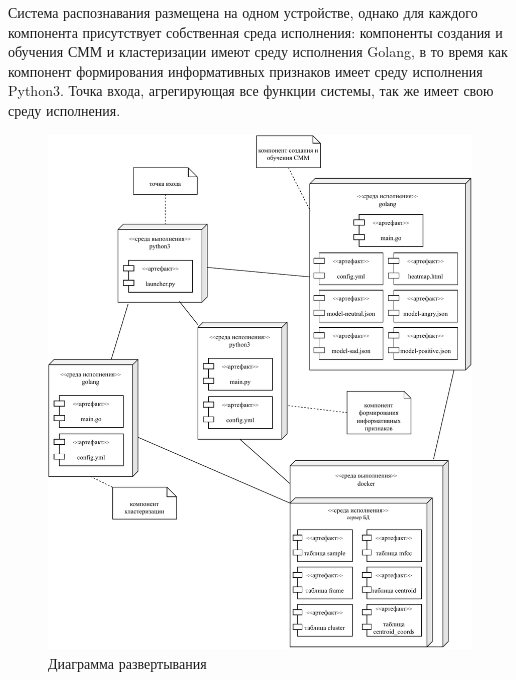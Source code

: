 Система распознавания размещена на одном устройстве, однако для каждого компонента присутствует собственная среда исполнения: компоненты создания и обучения СММ и кластеризации имеют среду исполнения Golang, в то время как компонент формирования информативных признаков имеет среду исполнения Python3.  Точка входа, агрегирующая все функции системы, так же имеет свою среду исполнения.  
\begin{figure}[H]
	\centering
	\includegraphics[width=\linewidth]{assets/deploy}
	\caption{Диаграмма развертывания}
	\label{fig:deploy}
\end{figure}   


